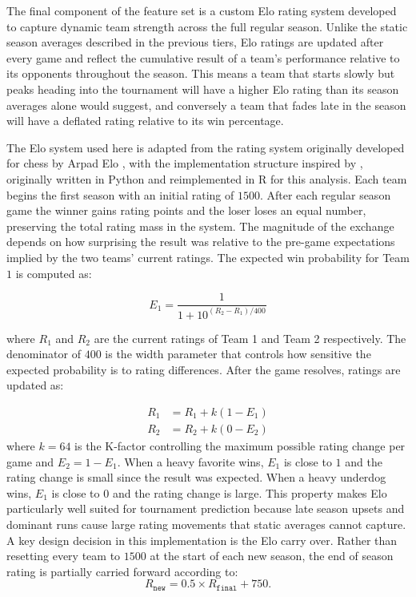 \documentclass[12pt,leqno]{article}\usepackage[pdftex]{graphicx}\usepackage[dvipsnames]{xcolor}
\theoremstyle{remark}
\begin{document}
The final component of the feature set is a custom Elo rating system developed to capture dynamic team strength across the full regular season. Unlike the static season averages described in the previous tiers, Elo ratings are updated after every game and reflect the cumulative result of a team's performance relative to its opponents throughout the season. This means a team that starts slowly but peaks heading into the tournament will have a higher Elo rating than its season averages alone would suggest, and conversely a team that fades late in the season will have a deflated rating relative to its win percentage.

The Elo system used here is adapted from the rating system originally developed for chess by Arpad Elo \cite{chess}, with the implementation structure inspired by \cite{haupts_elo}, originally written in Python and reimplemented in R for this analysis. Each team begins the first season with an initial rating of $1500$. After each regular season game the winner gains rating points and the loser loses an equal number, preserving the total rating mass in the system. The magnitude of the exchange depends on how surprising the result was relative to the pre-game expectations implied by the two teams' current ratings. The expected win probability for Team $1$ is computed as:

\begin{equation}
E_1 = \frac{1}{1 + 10^{(R_2 - R_1) / 400}}
\end{equation}

where $R_1$ and $R_2$ are the current ratings of Team 1 and Team 2 respectively. The denominator of $400$ is the width parameter that controls how sensitive the expected probability is to rating differences. After the game resolves, ratings are updated as:

\begin{align*}
R_1 &= R_1 + k(1 - E_1) \\
R_2 &= R_2 + k(0 - E_2) 
\end{align*}
where $k=64$ is the K-factor controlling the maximum possible rating change per game and $E_2 = 1 - E_1$. When a heavy favorite wins, $E_1$ is close to $1$ and the rating change is small since the result was expected. When a heavy underdog wins, $E_1$ is close to $0$ and the rating change is large. This property makes Elo particularly well suited for tournament prediction because late season upsets and dominant runs cause large rating movements that static averages cannot capture. A key design decision in this implementation is the Elo carry over. Rather than resetting every team to $1500$ at the start of each new season, the end of season rating is partially carried forward according to:
\begin{equation}
R_{\texttt{new}} = 0.5 \times R_{\texttt{final}} + 750.
\end{equation}
\end{document}
